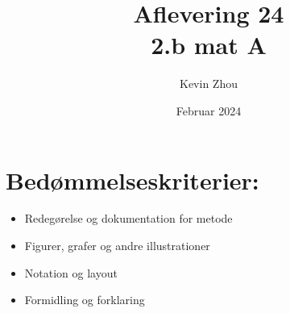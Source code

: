 \documentclass{article}
\title{Aflevering 24\\
{\Large \textbf{2.b mat A}}}
\author{Kevin Zhou}
\date{Februar 2024}
\begin{document}
\maketitle
\section*{Bedømmelseskriterier:}
\begin{itemize}
    \setlength\itemsep{3cm}
    \Large
    \item  Redegørelse og dokumentation for metode
    \item Figurer, grafer og andre illustrationer
    \item Notation og layout
    \item Formidling og forklaring
\end{itemize}
\pagebreak
\end{document}
